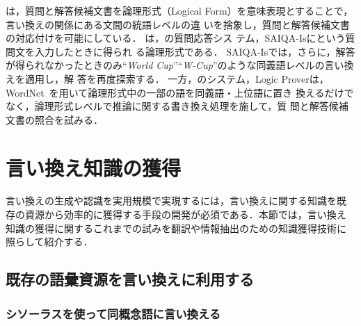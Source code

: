 は，質問と解答候補文書を論理形式（Logical
Form）を意味表現とすることで，言い換えの関係にある文間の統語レベルの違
いを捨象し，質問と解答候補文書の対応付けを可能にしている．
は，\citeauthor{sasaki:02}の質問応答シス
テム，SAIQA-Isにという質問文を入力したときに得られ
る論理形式である．
SAIQA-Isでは，さらに，解答が得られなかったときのみ``\emph{World
Cup}''{\ra}``\emph{W-Cup}''のような同義語レベルの言い換えを適用し，解
答を再度探索する．
一方，\citeauthor{moldovan:03}のシステム，Logic Proverは，
WordNet~\cite{WN:90}を用いて論理形式中の一部の語を同義語・上位語に置き
換えるだけでなく，論理形式レベルで推論に関する書き換え処理を施して，質
問と解答候補文書の照合を試みる．


\section{言い換え知識の獲得}
\label{sec:knowledge}

言い換えの生成や認識を実用規模で実現するには，言い換えに関する知識を既
存の資源から効率的に獲得する手段の開発が必須である．本節では，言い換え
知識の獲得に関するこれまでの試みを翻訳や情報抽出のための知識獲得技術に
照らして紹介する．

\subsection{既存の語彙資源を言い換えに利用する}
\label{ssec:existent}

\subsubsection{シソーラスを使って同概念語に言い換える}

